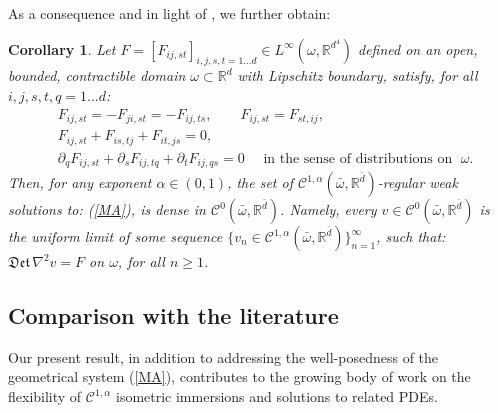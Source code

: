 \documentclass[reqno,twoside,11pt]{amsart}
\newcommand{\R}{\mathbb{R}}
\numberwithin{equation}{section}
\theoremstyle{plain}
\newtheorem{corollary}[theorem]{Corollary}
\theoremstyle{definition}
\begin{document}
\medskip

\noindent As a consequence and in light of \cite[Theorem 1.8, Theorem 1.10]{lew_conv}, we further obtain: 

\begin{corollary}\label{th_weakMA} 
Let $F=[F_{ij, st}]_{i,j,s,t=1\ldots
  d}\in L^\infty(\omega, \R^{d^4})$ defined on an open, bounded, contractible
domain $\omega\subset\mathbb{R}^d$ with Lipschitz boundary, satisfy, for all $i,j,s,t,q=1\ldots d$:
\begin{equation}\label{symF}
\begin{split}
& F_{ij,st} = - F_{ji,st} = -F_{ij, ts}, \qquad F_{ij, st} = F_{st,ij},
\\ & F_{ij, st}+F_{is,tj} + F_{it,js} = 0, 
\\ & \partial_qF_{ij,st} + \partial_sF_{ij,tq} + \partial_tF_{ij,qs} = 0
\quad \mbox{ in the sense of distributions on }\; \omega. 
\end{split}
\end{equation}
Then, for any exponent $\alpha\in
(0,1)$, the set of $\mathcal{\mathcal{C}}^{1,\alpha}(\bar\omega,
\R^{\bar d})$-regular weak solutions to:
(\ref{MA}), is dense in $\mathcal{\mathcal{C}}^0(\bar\omega, \R^{\bar d})$. 
Namely, every $v\in \mathcal{\mathcal{C}}^0(\bar\omega,\R^{\bar d})$ is the
uniform limit of some sequence
$\{v_n\in\mathcal{\mathcal{C}}^{1,\alpha}(\bar\omega,\R^{\bar d})\}_{n=1}^\infty$, such that: 
$\mathfrak{Det}\,\nabla^2v= F$ on $\omega$, for all $n\geq 1$.
\end{corollary} 

\medskip

\subsection{Comparison with the literature} Our present result, in
addition to addressing the well-posedness of the geometrical
system (\ref{MA}), contributes to the growing body of work on the
flexibility of $\mathcal{C}^{1,\alpha}$ isometric immersions and
solutions to related PDEs. 

\medskip
\end{document}
